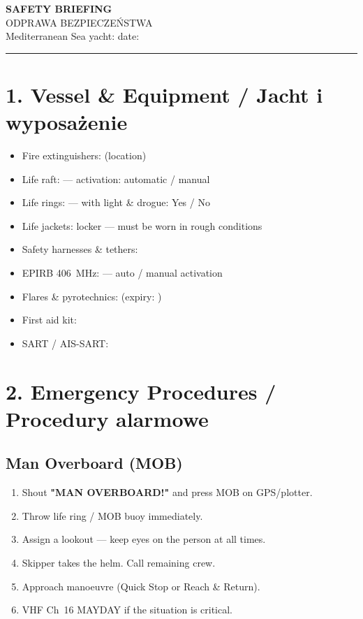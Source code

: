 \documentclass[a4paper,11pt]{article}
\begin{document}

\begin{center}
    {\Large\bfseries\color{pzzblue} SAFETY BRIEFING}\\
    {\large ODPRAWA BEZPIECZEŃSTWA}\\[4pt]
    {\normalsize Mediterranean Sea \textbullet{} yacht: \field{5cm} \textbullet{} date: \field{3cm}}
\end{center}

\vspace{0.3cm}
\noindent\rule{\linewidth}{1pt}

\section*{1. Vessel \& Equipment / Jacht i wyposażenie}

\begin{itemize}[noitemsep]
    \item Fire extinguishers: \field{5cm} (location)
    \item Life raft: \field{5cm} — activation: automatic / manual
    \item Life rings: \field{4cm} — with light \& drogue: Yes / No
    \item Life jackets: locker \field{3cm} — must be worn in rough conditions
    \item Safety harnesses \& tethers: \field{5cm}
    \item EPIRB 406~MHz: \field{5cm} — auto / manual activation
    \item Flares \& pyrotechnics: \field{5cm} (expiry: \field{2cm})
    \item First aid kit: \field{4cm}
    \item SART / AIS-SART: \field{4cm}
\end{itemize}

\section*{2. Emergency Procedures / Procedury alarmowe}

\subsection*{Man Overboard (MOB)}
\begin{enumerate}[noitemsep]
    \item Shout \textbf{"MAN OVERBOARD!"} and press MOB on GPS/plotter.
    \item Throw life ring / MOB buoy immediately.
    \item Assign a lookout — keep eyes on the person at all times.
    \item Skipper takes the helm. Call remaining crew.
    \item Approach manoeuvre (Quick Stop or Reach \& Return).
    \item VHF Ch~16 MAYDAY if the situation is critical.
\end{enumerate}
\end{document}
